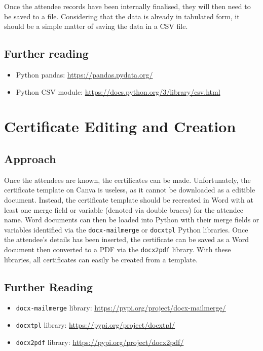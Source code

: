 \documentclass[11pt]{article}
\begin{document}
Once the attendee records have been internally finalised, they will then need to be saved to a file. Considering that the data is already in tabulated form, it should be a simple matter of saving the data in a CSV file.

\subsection{Further reading}

\begin{itemize}
    \item Python pandas: \url{https://pandas.pydata.org/}
    \item Python CSV module: \url{https://docs.python.org/3/library/csv.html}
\end{itemize}

\newpage

\section{Certificate Editing and Creation}

\subsection{Approach}

Once the attendees are known, the certificates can be made. Unfortunately, the certificate template on Canva is useless, as it cannot be downloaded as a editible document. Instead, the certificate template should be recreated in Word with at least one merge field or variable (denoted via double braces) for the attendee name. Word documents can then be loaded into Python with their merge fields or variables identified via the \texttt{docx-mailmerge} or \texttt{docxtpl} Python libraries. Once the attendee's details has been inserted, the certificate can be saved as a Word document then converted to a PDF via the \texttt{docx2pdf} library. With these libraries, all certificates can easily be created from a template.

\subsection{Further Reading}

\begin{itemize}
    \item \texttt{docx-mailmerge} library: \url{https://pypi.org/project/docx-mailmerge/}
    \item \texttt{docxtpl} library: \url{https://pypi.org/project/docxtpl/}
    \item \texttt{docx2pdf} library: \url{https://pypi.org/project/docx2pdf/}
\end{itemize}
\end{document}
